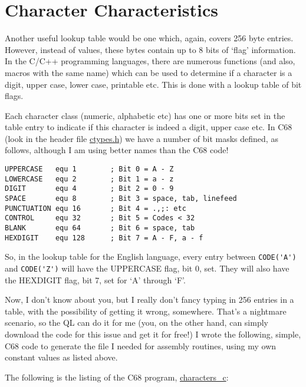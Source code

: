 \section{Character Characteristics}

Another useful lookup table would be one which, again, covers 256
byte entries. However, instead of values, these bytes contain up to
8 bits of `flag' information. In the C/C++ programming languages,
there are numerous functions (and also, macros with the same name)
which can be used to determine if a character is a digit, upper case,
lower case, printable etc. This is done with a lookup table of bit
flags.

Each character class (numeric, alphabetic etc) has one or more bits
set in the table entry to indicate if this character is indeed a digit,
upper case etc. In C68 (look in the header file \url{ctypes.h}) we
have a number of bit masks defined, as follows, although I am using
better names than the C68 code!

\begin{lstlisting}[caption={Character attribute bit masks}]
UPPERCASE   equ 1        ; Bit 0 = A - Z
LOWERCASE   equ 2        ; Bit 1 = a - z
DIGIT       equ 4        ; Bit 2 = 0 - 9
SPACE       equ 8        ; Bit 3 = space, tab, linefeed
PUNCTUATION equ 16       ; Bit 4 = .,;: etc
CONTROL     equ 32       ; Bit 5 = Codes < 32 
BLANK       equ 64       ; Bit 6 = space, tab
HEXDIGIT    equ 128      ; Bit 7 = A - F, a - f
\end{lstlisting}

So, in the lookup table for the English language, every entry between
\lstinline!CODE('A')! and \lstinline!CODE('Z')! will have the UPPERCASE
flag, bit 0, set. They will also have the HEXDIGIT flag, bit 7, set
for `A' through `F'.

Now, I don't know about you, but I really don't fancy typing in 256
entries in a table, with the possibility of getting it wrong, somewhere.
That's a nightmare scenario, so the QL can do it for me (you, on the
other hand, can simply download the code for this issue and get it
for free!) I wrote the following, simple, C68 code to generate the
file I needed for assembly routines, using my own constant values
as listed above.

The following is the listing of the C68 program, \url{characters_c}:

